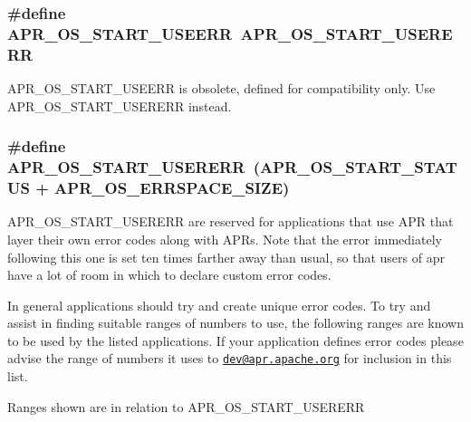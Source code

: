 \subsubsection[{\texorpdfstring{A\+P\+R\+\_\+\+O\+S\+\_\+\+S\+T\+A\+R\+T\+\_\+\+U\+S\+E\+E\+RR}{APR_OS_START_USEERR}}]{\setlength{\rightskip}{0pt plus 5cm}\#define A\+P\+R\+\_\+\+O\+S\+\_\+\+S\+T\+A\+R\+T\+\_\+\+U\+S\+E\+E\+RR~{\bf A\+P\+R\+\_\+\+O\+S\+\_\+\+S\+T\+A\+R\+T\+\_\+\+U\+S\+E\+R\+E\+RR}}\hypertarget{group__apr__errno_ga803b8badf8695bdfa4fbcf4d330371f0}{}\label{group__apr__errno_ga803b8badf8695bdfa4fbcf4d330371f0}
A\+P\+R\+\_\+\+O\+S\+\_\+\+S\+T\+A\+R\+T\+\_\+\+U\+S\+E\+E\+RR is obsolete, defined for compatibility only. Use A\+P\+R\+\_\+\+O\+S\+\_\+\+S\+T\+A\+R\+T\+\_\+\+U\+S\+E\+R\+E\+RR instead. 
\subsubsection[{\texorpdfstring{A\+P\+R\+\_\+\+O\+S\+\_\+\+S\+T\+A\+R\+T\+\_\+\+U\+S\+E\+R\+E\+RR}{APR_OS_START_USERERR}}]{\setlength{\rightskip}{0pt plus 5cm}\#define A\+P\+R\+\_\+\+O\+S\+\_\+\+S\+T\+A\+R\+T\+\_\+\+U\+S\+E\+R\+E\+RR~({\bf A\+P\+R\+\_\+\+O\+S\+\_\+\+S\+T\+A\+R\+T\+\_\+\+S\+T\+A\+T\+US} + {\bf A\+P\+R\+\_\+\+O\+S\+\_\+\+E\+R\+R\+S\+P\+A\+C\+E\+\_\+\+S\+I\+ZE})}\hypertarget{group__apr__errno_gacd35b2de1e38a1fa4717e38d5e153571}{}\label{group__apr__errno_gacd35b2de1e38a1fa4717e38d5e153571}
A\+P\+R\+\_\+\+O\+S\+\_\+\+S\+T\+A\+R\+T\+\_\+\+U\+S\+E\+R\+E\+RR are reserved for applications that use A\+PR that layer their own error codes along with A\+PR\textquotesingle{}s. Note that the error immediately following this one is set ten times farther away than usual, so that users of apr have a lot of room in which to declare custom error codes.

In general applications should try and create unique error codes. To try and assist in finding suitable ranges of numbers to use, the following ranges are known to be used by the listed applications. If your application defines error codes please advise the range of numbers it uses to \href{mailto:dev@apr.apache.org}{\tt dev@apr.\+apache.\+org} for inclusion in this list.

Ranges shown are in relation to A\+P\+R\+\_\+\+O\+S\+\_\+\+S\+T\+A\+R\+T\+\_\+\+U\+S\+E\+R\+E\+RR

